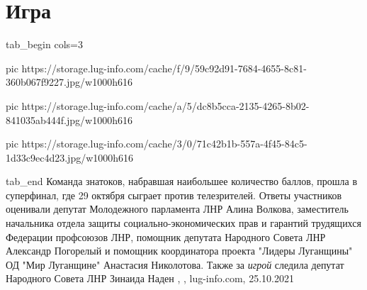  
 
 
 
 
\chapter{Игра}

\ifcmt
  tab_begin cols=3

     pic https://storage.lug-info.com/cache/f/9/59c92d91-7684-4655-8c81-360b067f9227.jpg/w1000h616

     pic https://storage.lug-info.com/cache/a/5/dc8b5cca-2135-4265-8b02-841035ab444f.jpg/w1000h616

     pic https://storage.lug-info.com/cache/3/0/71c42b1b-557a-4f45-84c5-1d33c9ec4d23.jpg/w1000h616

  tab_end
\fi
Команда знатоков, набравшая наибольшее количество баллов, прошла в суперфинал,
где 29 октября сыграет против телезрителей.  Ответы участников оценивали
депутат Молодежного парламента ЛНР Алина Волкова, заместитель начальника отдела
защиты социально-экономических прав и гарантий трудящихся Федерации профсоюзов
ЛНР, помощник депутата Народного Совета ЛНР Александр Погорелый и помощник
координатора проекта "Лидеры Луганщины" ОД "Мир Луганщине" Анастасия
Николотова. Также за \emph{игрой} следила депутат Народного Совета ЛНР Зинаида
Наден
, 
, lug-info.com, 25.10.2021
